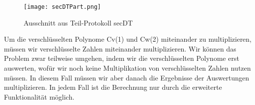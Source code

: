 \begin{figure}[h]
\begin{center}
\texttt{[image: secDTPart.png]}
\caption{Ausschnitt aus Teil-Protokoll secDT}
\cite{Doettling2021}
\label{secDT}
\end{center}

\end{figure}

Um die verschlüsselten Polynome Cv(1) und Cw(2) miteinander zu multiplizieren, müssen wir verschlüsselte Zahlen miteinander multiplizieren. Wir können das Problem zwar teilweise umgehen, indem wir die verschlüsselten Polynome erst auswerten, wofür wir noch keine Multiplikation von verschlüsselten Zahlen nutzen müssen. In diesem Fall müssen wir aber danach die Ergebnisse der Auswertungen multiplizieren. In jedem Fall ist die Berechnung nur durch die erweiterte Funktionalität möglich.



